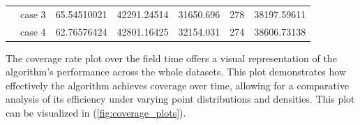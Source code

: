 \begin{table}[]
\begin{tabular}{cllllll}
    \rowcolor[HTML]{FFFFC7} 
    \cellcolor[HTML]{FFFFC7}                                                                                               & case 3                  & 65.54510021                                                                            & 42291.24514                                                                               & 31650.696                                                                           & 278                                                                        & 38197.59611                                                                                \\ \cline{2-7} 
    \rowcolor[HTML]{FFFFC7} 
    \multirow{-4}{*}{\cellcolor[HTML]{FFFFC7}10000}                                                                        & case 4                  & 62.76576424                                                                            & 42801.16425                                                                               & 32154.031                                                                           & 274                                                                        & 38606.73138                                                                                \\ \hline
    \end{tabular}
    \end{table}



\vspace*{6mm} 


The coverage rate plot over the field time offers a visual representation of the algorithm's performance across the whole datasets. This plot demonstrates how effectively the algorithm achieves coverage over time, allowing for a comparative analysis of its efficiency under varying point distributions and densities. This plot can be visualized in (\autoref{fig:coverage_plots}).   

